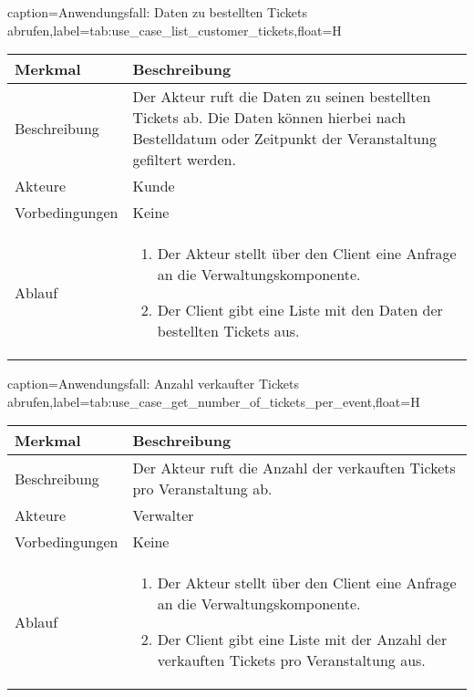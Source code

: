 \begin{dhbwtable}{caption={Anwendungsfall: Daten zu bestellten Tickets abrufen},label=tab:use_case_list_customer_tickets,float=H}
    \begin{tabularx}{\textwidth}{lX}
        \toprule
        \textbf{Merkmal} & \textbf{Beschreibung}  \\ \midrule
        Beschreibung    & Der Akteur ruft die Daten zu seinen bestellten Tickets ab. Die Daten können hierbei nach Bestelldatum oder Zeitpunkt der Veranstaltung gefiltert werden. \\
        Akteure         & Kunde \\
        Vorbedingungen  & Keine \\
        Ablauf          & \begin{enumerate}
            \item Der Akteur stellt über den Client eine Anfrage an die Verwaltungskomponente.
            \item Der Client gibt eine Liste mit den Daten der bestellten Tickets aus.
        \end{enumerate} \\\bottomrule
    \end{tabularx}    
\end{dhbwtable}

\begin{dhbwtable}{caption={Anwendungsfall: Anzahl verkaufter Tickets abrufen},label=tab:use_case_get_number_of_tickets_per_event,float=H}
    \begin{tabularx}{\textwidth}{lX}
        \toprule
        \textbf{Merkmal} & \textbf{Beschreibung}  \\ \midrule
        Beschreibung    & Der Akteur ruft die Anzahl der verkauften Tickets pro Veranstaltung ab. \\
        Akteure         & Verwalter \\
        Vorbedingungen  & Keine \\
        Ablauf          & \begin{enumerate}
            \item Der Akteur stellt über den Client eine Anfrage an die Verwaltungskomponente.
            \item Der Client gibt eine Liste mit der Anzahl der verkauften Tickets pro Veranstaltung aus.
        \end{enumerate} \\\bottomrule
    \end{tabularx}    
\end{dhbwtable}

